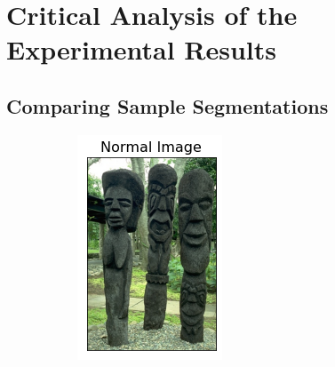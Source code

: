 \documentclass[12pt]{extarticle}
\begin{document}
\section{Critical Analysis of the Experimental Results}

  \subsection{Comparing Sample Segmentations}

    \begin{figure}[!h] %
      \begin{subfigure}[b]{0.19\textwidth}
        \includegraphics[width=\textwidth]{normal_compared.png}
        \caption{}
        \label{fig:f1}

\end{subfigure}
\end{figure}
\end{document}
